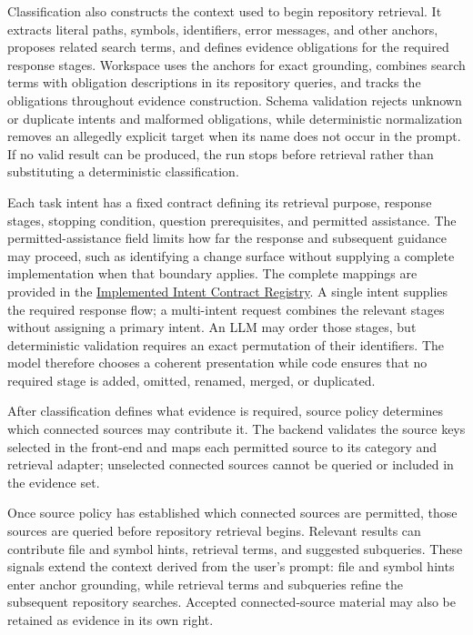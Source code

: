 Classification also constructs the context used to begin repository retrieval. It extracts literal paths, symbols, identifiers, error messages, and other anchors, proposes related search terms, and defines evidence obligations for the required response stages. Workspace uses the anchors for exact grounding, combines search terms with obligation descriptions in its repository queries, and tracks the obligations throughout evidence construction. Schema validation rejects unknown or duplicate intents and malformed obligations, while deterministic normalization removes an allegedly explicit target when its name does not occur in the prompt. If no valid result can be produced, the run stops before retrieval rather than substituting a deterministic classification.

Each task intent has a fixed contract defining its retrieval purpose, response stages, stopping condition, question prerequisites, and permitted assistance. The permitted-assistance field limits how far the response and subsequent guidance may proceed, such as identifying a change surface without supplying a complete implementation when that boundary applies. The complete mappings are provided in the \hyperref[ch:implemented-intent-contract-registry]{Implemented Intent Contract Registry}. A single intent supplies the required response flow; a multi-intent request combines the relevant stages without assigning a primary intent. An LLM may order those stages, but deterministic validation requires an exact permutation of their identifiers. The model therefore chooses a coherent presentation while code ensures that no required stage is added, omitted, renamed, merged, or duplicated.

After classification defines what evidence is required, source policy determines which connected sources may contribute it. The backend validates the source keys selected in the front-end and maps each permitted source to its category and retrieval adapter; unselected connected sources cannot be queried or included in the evidence set.

Once source policy has established which connected sources are permitted, those sources are queried before repository retrieval begins. Relevant results can contribute file and symbol hints, retrieval terms, and suggested subqueries. These signals extend the context derived from the user's prompt: file and symbol hints enter anchor grounding, while retrieval terms and subqueries refine the subsequent repository searches. Accepted connected-source material may also be retained as evidence in its own right.

